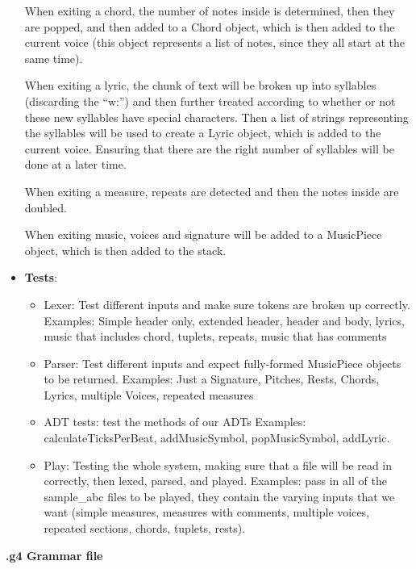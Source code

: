 \documentclass[12pt]{book}
\begin{document}
\begin{itemize}
When exiting a chord, the number of notes inside is determined, then they are popped, and then added to a Chord object, which is then added to the current voice (this object represents a list of notes, since they all start at the same time).

When exiting a lyric, the chunk of text will be broken up into syllables (discarding the “w:”) and then further treated according to whether or not these new syllables have special characters. Then a list of strings representing the syllables will be used to create a Lyric object, which is added to the current voice. Ensuring that there are the right number of syllables will be done at a later time.

When exiting a measure, repeats are detected and then the notes inside are doubled.

When exiting music, voices and signature will be added to a MusicPiece object, which is then added to the stack.

\item {\bf Tests}:
\begin{itemize}
\item Lexer: Test different inputs and make sure tokens are broken up correctly. 
Examples: Simple header only, extended header, header and body, lyrics, music that includes chord, tuplets, repeats, music that has comments
\item Parser: Test different inputs and expect fully-formed MusicPiece objects to be returned. 
Examples: Just a Signature, Pitches, Rests, Chords, Lyrics, multiple Voices, repeated measures
\item ADT tests: test the methods of our ADTs
Examples: calculateTicksPerBeat, addMusicSymbol, popMusicSymbol, addLyric.
\item Play: Testing the whole system, making sure that a file will be read in correctly, then lexed, parsed, and played.
Examples: pass in all of the sample\_abc files to be played, they contain the varying inputs that we want (simple measures, measures with comments, multiple voices, repeated sections, chords, tuplets, rests).
\end{itemize}

\end{itemize}

\bigskip
\centerline{{\large \bf .g4 Grammar file }}
\bigskip
\end{document}
